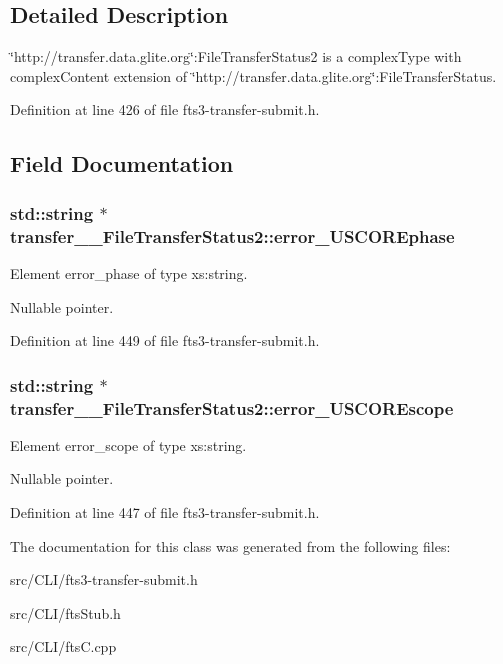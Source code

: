 \subsection{Detailed Description}
\char`\"{}http://transfer.data.glite.org\char`\"{}:FileTransferStatus2 is a complexType with complexContent extension of \char`\"{}http://transfer.data.glite.org\char`\"{}:FileTransferStatus. 

Definition at line 426 of file fts3-\/transfer-\/submit.h.



\subsection{Field Documentation}
\subsubsection[{error\_\-USCOREphase}]{\setlength{\rightskip}{0pt plus 5cm}std::string $\ast$ {\bf transfer\_\-\_\-FileTransferStatus2::error\_\-USCOREphase}}\label{classtransfer____FileTransferStatus2_ac854f3d552f37da65996694a526dd1fe}


Element error\_\-phase of type xs:string. 

Nullable pointer. 

Definition at line 449 of file fts3-\/transfer-\/submit.h.

\subsubsection[{error\_\-USCOREscope}]{\setlength{\rightskip}{0pt plus 5cm}std::string $\ast$ {\bf transfer\_\-\_\-FileTransferStatus2::error\_\-USCOREscope}}\label{classtransfer____FileTransferStatus2_ad90e6aa496483063209a31faa8a80b97}


Element error\_\-scope of type xs:string. 

Nullable pointer. 

Definition at line 447 of file fts3-\/transfer-\/submit.h.



The documentation for this class was generated from the following files:\begin{DoxyCompactItemize}
\item 
src/CLI/fts3-\/transfer-\/submit.h\item 
src/CLI/ftsStub.h\item 
src/CLI/ftsC.cpp\end{DoxyCompactItemize}
